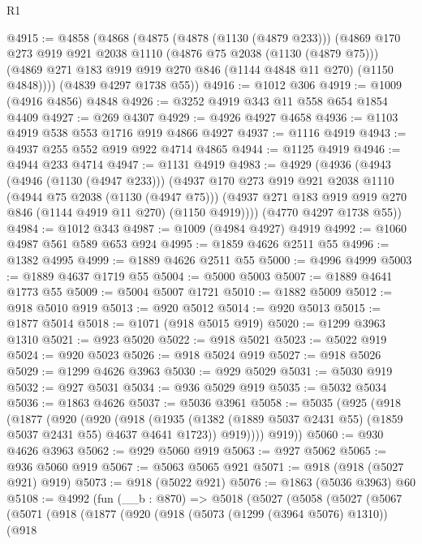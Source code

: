 \begin{lexlean}{R1}
\begin{coremodule}
@4915 := @4858
    (@4868
      (@4875
        (@4878 (@1130 (@4879 @233)))
        (@4869
          @170
          @273
          @919
          @921
          @2038
          @1110
          (@4876 @75 @2038 (@1130 (@4879 @75)))
          (@4869 @271 @183 @919 @919 @270 @846 (@1144 @4848 @11 @270) (@1150 @4848))))
      (@4839 @4297 @1738 @55))
@4916 := @1012 @306
@4919 := @1009 (@4916 @4856) @4848
@4926 := @3252 @4919 @343 @11 @558 @654 @1854 @4409
@4927 := @269 @4307
@4929 := @4926 @4927 @4658
@4936 := @1103 @4919 @538 @553 @1716 @919 @4866 @4927
@4937 := @1116 @4919
@4943 := @4937 @255 @552 @919 @922 @4714 @4865
@4944 := @1125 @4919
@4946 := @4944 @233 @4714
@4947 := @1131 @4919
@4983 := @4929
    (@4936
      (@4943
        (@4946 (@1130 (@4947 @233)))
        (@4937
          @170
          @273
          @919
          @921
          @2038
          @1110
          (@4944 @75 @2038 (@1130 (@4947 @75)))
          (@4937 @271 @183 @919 @919 @270 @846 (@1144 @4919 @11 @270) (@1150 @4919))))
      (@4770 @4297 @1738 @55))
@4984 := @1012 @343
@4987 := @1009 (@4984 @4927) @4919
@4992 := @1060 @4987 @561 @589 @653 @924
@4995 := @1859 @4626 @2511 @55
@4996 := @1382 @4995
@4999 := @1889 @4626 @2511 @55
@5000 := @4996 @4999
@5003 := @1889 @4637 @1719 @55
@5004 := @5000 @5003
@5007 := @1889 @4641 @1773 @55
@5009 := @5004 @5007 @1721
@5010 := @1882 @5009
@5012 := @918 @5010 @919
@5013 := @920 @5012
@5014 := @920 @5013
@5015 := @1877 @5014
@5018 := @1071 (@918 @5015 @919)
@5020 := @1299 @3963 @1310
@5021 := @923 @5020
@5022 := @918 @5021
@5023 := @5022 @919
@5024 := @920 @5023
@5026 := @918 @5024 @919
@5027 := @918 @5026
@5029 := @1299 @4626 @3963
@5030 := @929 @5029
@5031 := @5030 @919
@5032 := @927 @5031
@5034 := @936 @5029 @919
@5035 := @5032 @5034
@5036 := @1863 @4626
@5037 := @5036 @3961
@5058 := @5035
    (@925
      (@918
        (@1877
          (@920
            (@920
              (@918
                (@1935 (@1382 (@1889 @5037 @2431 @55) (@1859 @5037 @2431 @55) @4637 @4641 @1723))
                @919))))
        @919))
@5060 := @930 @4626 @3963
@5062 := @929 @5060 @919
@5063 := @927 @5062
@5065 := @936 @5060 @919
@5067 := @5063 @5065 @921
@5071 := @918 (@918 (@5027 @921) @919)
@5073 := @918 (@5022 @921)
@5076 := @1863 (@5036 @3963) @60
@5108 := @4992
    (fun (__b : @870) =>
    @5018
      (@5027
        (@5058
          (@5027
            (@5067
              (@5071
                (@918
                  (@1877
                    (@920
                      (@918
                        (@5073 (@1299 (@3964 @5076) @1310))
                        (@918

\end{coremodule}
\end{lexlean}
